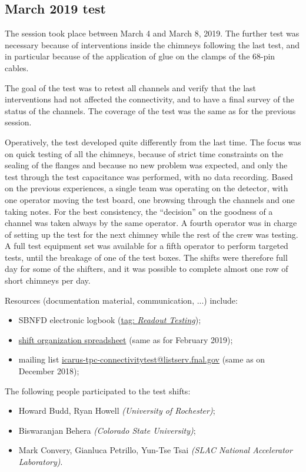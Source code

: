 \subsection{March 2019 test}
\label{ssec:operations:March2019}

The session took place between March 4 and March 8, 2019.
The further test was necessary because of interventions inside the chimneys
following the last test, and in particular because of the application of glue
on the clamps of the 68-pin cables.

The goal of the test was to retest all channels and verify that the last
interventions had not affected the connectivity, and to have a final survey of
the status of the channels. The coverage of the test was the same as for the
previous session.

Operatively, the test developed quite differently from the last time.
The focus was on quick testing of all the chimneys, because of strict time
constraints on the sealing of the flanges and because no new problem was
expected, and only the test through the test capacitance was performed, with no
data recording.
Based on the previous experiences, a single team was operating on the detector,
with one operator moving the test board, one browsing through the channels and
one taking notes. For the best consistency, the ``decision'' on the goodness of
a channel was taken always by the same operator. A fourth operator was in charge
of setting up the test for the next chimney while the rest of the crew was
testing. A full test equipment set was available for a fifth operator to perform
targeted tests, until the breakage of one of the test boxes.
The shifts were therefore full day for some of the shifters, and it was possible
to complete almost one row of short chimneys per day.

Resources (documentation material, communication, ...) include:
\begin{itemize}
  \item SBNFD electronic logbook (\href{http://dbweb6.fnal.gov:8080/ECL/sbnfd/E/search?id=&id_from=&id_to=&t_after=03\%2F02\%2F2019&t_before=03\%2F15\%2F2019&tag\%3AReadout+Testing=on&action=Search}{tag: \emph{Readout Testing}});
  \item \href{https://docs.google.com/spreadsheets/d/1wwkhF9-X4gV3Hmp61LN8EbjIY5xaMLv4yKINKjvRKVQ/edit?usp=sharing}{shift organization spreadsheet}
    (same as for February 2019);
  \item mailing list \href{https://listserv.fnal.gov/scripts/wa.exe?A0=ICARUS-TPC-CONNECTIVITYTEST}{icarus-tpc-connectivitytest@listserv.fnal.gov}
    (same as on December 2018);
\end{itemize}

The following people participated to the test shifts:
\begin{itemize}
  \item Howard Budd, Ryan Howell \emph{(University of Rochester)};
  \item Biswaranjan Behera \emph{(Colorado State University)};
  \item Mark Convery, Gianluca Petrillo, Yun-Tse Tsai \emph{(SLAC National Accelerator Laboratory)}.
\end{itemize}
